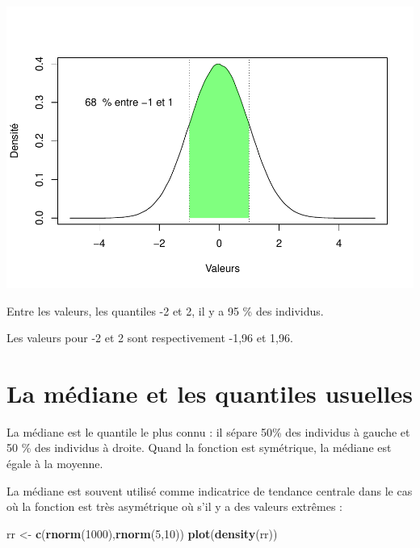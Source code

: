 \documentclass[
]{book}
\newenvironment{Shaded}{\begin{snugshade}}{\end{snugshade}}
\newcommand{\DecValTok}[1]{\textcolor[rgb]{0.00,0.00,0.81}{#1}}
\newcommand{\FunctionTok}[1]{\textcolor[rgb]{0.13,0.29,0.53}{\textbf{#1}}}
\newcommand{\NormalTok}[1]{#1}
\newcommand{\OtherTok}[1]{\textcolor[rgb]{0.56,0.35,0.01}{#1}}
\begin{document}
\includegraphics{_main_files/figure-latex/unnamed-chunk-14-1.pdf}

Entre les valeurs, les quantiles -2 et 2, il y a
95 \% des individus.

Les valeurs pour -2 et 2 sont respectivement -1,96 et 1,96.

\hypertarget{la-muxe9diane-et-les-quantiles-usuelles}{%
\section{La médiane et les quantiles usuelles}\label{la-muxe9diane-et-les-quantiles-usuelles}}

La médiane est le quantile le plus connu : il sépare 50\% des individus à gauche
et 50 \% des individus à droite. Quand la fonction est symétrique, la médiane est
égale à la moyenne.

La médiane est souvent utilisé comme indicatrice de tendance centrale dans le
cas où la fonction est très asymétrique où s'il y a des valeurs extrêmes :

\begin{Shaded}
\begin{Highlighting}[]
\NormalTok{rr }\OtherTok{\textless{}{-}} \FunctionTok{c}\NormalTok{(}\FunctionTok{rnorm}\NormalTok{(}\DecValTok{1000}\NormalTok{),}\FunctionTok{rnorm}\NormalTok{(}\DecValTok{5}\NormalTok{,}\DecValTok{10}\NormalTok{))}
\FunctionTok{plot}\NormalTok{(}\FunctionTok{density}\NormalTok{(rr))}
\end{Highlighting}
\end{Shaded}
\end{document}
